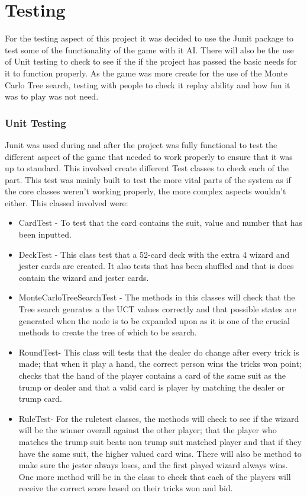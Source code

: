 \chapter{Testing}
For the testing aspect of this project it was decided to use the Junit package to test some of the functionality of the game with it AI. There will also be the use of Unit testing to check to see if the if the project has passed the basic needs for it to function properly. As the game was more create for the use of the Monte Carlo Tree search, testing with people to check it replay ability and how fun it was to play was not need.
\subsection{Unit Testing}
Junit was used during and after the project was fully functional to test the different aspect of the game that needed to work properly to ensure that it was up to standard. This involved create different Test classes to check each of the part. This test was mainly built to test the more vital parts of the system as if the core classes weren’t working properly, the more complex aspects wouldn’t either. This classed involved were:
\begin{itemize}
\item CardTest - To test that the card contains the suit, value and number that has been inputted.
\item DeckTest - This class test that a 52-card deck with the extra 4 wizard and jester cards are created. It also tests that has been shuffled and that is does contain the wizard and jester cards.
\item MonteCarloTreeSearchTest - The methods in this classes will check that the Tree search genrates a the UCT values correctly and that possible states are generated when the node is to be expanded upon as it is one of the crucial methods to create the tree of which to be search.
\item RoundTest- This class will tests that the dealer do change after every trick is made; that when it play a hand, the correct person wins the tricks won point; checks that the hand of the player contains a card of the same suit as the trump or dealer and that a valid card is player by matching the dealer or trump card.
\item RuleTest- For the ruletest classes, the methods will check to see if the wizard will be the winner overall against the other player; that the player who matches the trump suit beats non trump suit matched player and that if they have the same suit, the higher valued card wins. There will also be method to make sure the jester always loses, and the first played wizard always wins. One more method will be in the class to check that each of the players will receive the correct score based on their tricks won and bid.
\end{itemize}
